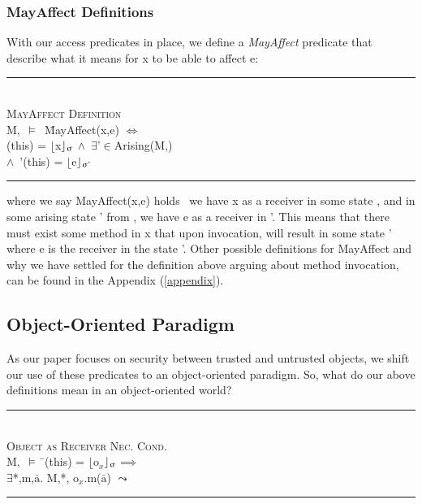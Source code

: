 \documentclass[a4paper,11pt, twoside,twocolumn]{article}
\newenvironment{logic}
{\begin{minipage}[c]{\linewidth}  \small \vspace{0.5em}\begin{tabbing}}
{\end{tabbing}\end{minipage}\vspace{0.5em}}
\newcommand{\loin}{$\in$}
\newcommand{\loexists}{$\exists$}
\newcommand{\loand}{$\land$}
\newcommand{\loimplies}{$\implies$}
\newcommand{\losigma}{\text{$\upsigma$}}
\newcommand{\loturns} {$\vDash$}
\newcommand{\loiff} {$\iff$}
\newcommand{\loleadsto} {$\leadsto$}
\newcommand{\loexec}[2] {$\lfloor$#1$\rfloor _{\text{#2}}$}
\newcommand{\loconj}[1] {$\bar{\text{#1}}$}
\newcommand{\lotiff} {\textit{\textls[-20]{iff}}}
\newcommand{\hr}{\rule{\linewidth}{0.4pt}}
\begin{document}
\subsubsection{MayAffect Definitions}
With our access predicates in place, we define a \textit{MayAffect} predicate that describe what it means for x to be able to affect e:\\
\begin{logic}
\hr\\
\textsc{\normalsize *MayAffect Definition}\\\vspace{0.5em}
M,\losigma\ \loturns\ \=MayAffect(x,e) \loiff \\
\> \losigma(this) = \loexec{x}{\losigma} \loand\ \loexists \losigma'\loin Arising(M,\losigma)\\
\> \loand\ \losigma'(this) = \loexec{e}{\losigma'}\\
\hr
\end{logic}

where we say MayAffect(x,e) holds \lotiff\ we have x as a receiver in some state \losigma, and in some arising state \losigma' from \losigma, we have e as a receiver in \losigma'. This means that there must exist some method in x that upon invocation, will result in some state \losigma' where e is the receiver in the state \losigma'. Other possible definitions for MayAffect and why we have settled for the definition above arguing about method invocation, can be found in the Appendix (\ref{appendix}).\\


\subsection{Object-Oriented Paradigm}
 
As our paper focuses on security between trusted and untrusted objects, we shift our use of these predicates to an object-oriented paradigm. So, what do our above definitions mean in an object-oriented world?

\begin{logic}
\hr\\
\textsc{\normalsize *Object as Receiver Nec. Cond.}\\\vspace{0.5em}
M,\losigma\ \loturns\ \=\losigma(this) = \loexec{o$_x$}{\losigma}\loimplies \\
\> \loexists \losigma*,m,\loconj{a}. M,\losigma*, o$_x$.m(\loconj{a}) \loleadsto\ \losigma\\
\hr
\end{logic}
\end{document}

